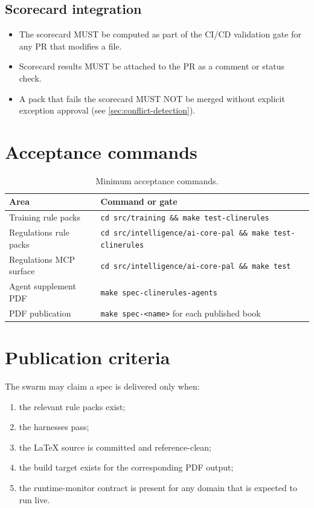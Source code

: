 \subsection{Scorecard integration}

\begin{itemize}
  \item The scorecard MUST be computed as part of the CI/CD validation
    gate for any PR that modifies a  file.
  \item Scorecard results MUST be attached to the PR as a comment or
    status check.
  \item A pack that fails the scorecard MUST NOT be merged without
    explicit exception approval (see \cref{sec:conflict-detection}).
\end{itemize}

\section{Acceptance commands}

\begin{table}[htbp]
\centering
\footnotesize
\caption{Minimum acceptance commands.}
\label{tab:acceptance}
\begin{tabularx}{\textwidth}{@{}l X@{}}
\toprule
\textbf{Area} & \textbf{Command or gate} \\
\midrule
Training rule packs & \texttt{cd src/training \&\& make test-clinerules} \\
Regulations rule packs & \texttt{cd src/intelligence/ai-core-pal \&\& make test-clinerules} \\
Regulations MCP surface & \texttt{cd src/intelligence/ai-core-pal \&\& make test} \\
Agent supplement PDF & \texttt{make spec-clinerules-agents} \\
PDF publication & \texttt{make spec-<name>} for each published book \\
\bottomrule
\end{tabularx}
\end{table}

\section{Publication criteria}

The swarm may claim a spec is delivered only when:
\begin{enumerate}
  \item the relevant rule packs exist;
  \item the harnesses pass;
  \item the LaTeX source is committed and reference-clean;
  \item the build target exists for the corresponding PDF output;
  \item the runtime-monitor contract is present for any domain that is
    expected to run live.
\end{enumerate}

